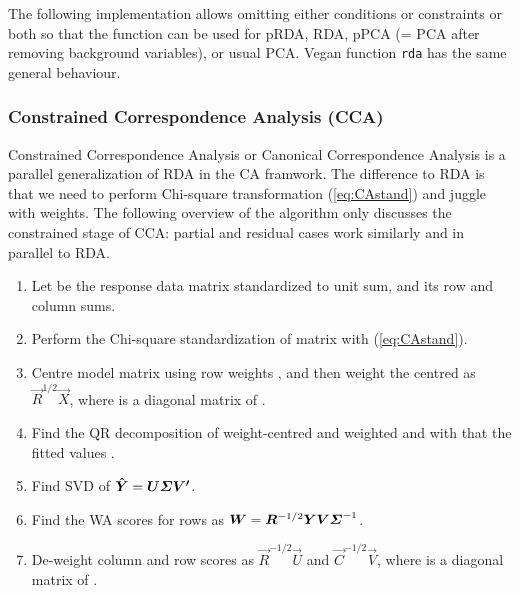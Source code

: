 The following implementation allows omitting either conditions or
constraints or both so that the function can be used for pRDA, RDA,
pPCA (= PCA after removing background variables), or usual PCA. Vegan
function \texttt{rda} has the same general behaviour.

\begin{Schunk}
\end{Schunk}

\subsubsection{Constrained Correspondence Analysis (CCA)}

Constrained Correspondence Analysis or Canonical Correspondence
Analysis is a parallel generalization of RDA in the CA framwork.  The
difference to RDA is that we need to perform Chi-square transformation
(\ref{eq:CAstand}) and juggle with weights.
The following overview of the algorithm only discusses
the constrained stage of CCA: partial and residual cases work
similarly and in parallel to RDA.

\begin{enumerate}
\item Let  be the response data matrix standardized to unit
  sum,  and  its row and column sums.
\item Perform the Chi-square standardization of  matrix with
  (\ref{eq:CAstand}).
\item Centre model matrix  using row weights , and then
  weight the centred  as $\vec{R}^{1/2} \vec{X}$, where 
  is a diagonal matrix of .
\item Find the QR decomposition of weight-centred and weighted 
  and with that the fitted values .
\item Find SVD of $\vec{\hat Y} = \vec{U \bSigma V'}$.
\item Find the WA scores for rows as $\vec{W} = \vec{R}^{-1/2}
  \vec{Y V} \bSigma^{-1}$.
\item De-weight column and row scores as $\vec{R}^{-1/2} \vec{U}$ and
  $\vec{C}^{-1/2} \vec{V}$, where  is a diagonal matrix of
  .
\end{enumerate}

